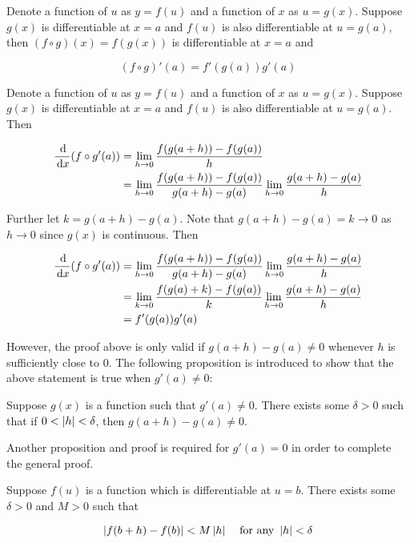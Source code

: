 \documentclass[a4paper,12pt]{article}
\begin{document}
\begin{thm}
  Denote a function of $u$ as $y=f(u)$ and a function of $x$ as $u=g(x)$. Suppose $g(x)$ is differentiable at $x=a$ and $f(u)$ is also differentiable at $u=g(a)$, then $(f\circ g)(x)=f(g(x))$ is differentiable at $x=a$ and

  $$(f\circ g)'(a)=f'(g(a))g'(a)$$\s

  \prf Denote a function of $u$ as $y=f(u)$ and a function of $x$ as $u=g(x)$. Suppose $g(x)$ is differentiable at $x=a$ and $f(u)$ is also differentiable at $u=g(a)$. Then

  $$\begin{aligned}[t]
    \frac{\,\mathrm{d}}{\,\mathrm{d} x}(f\circ g'(a))&=\lim_{h\to 0}\frac{f(g(a+h))-f(g(a))}{h}\\
    &=\lim_{h\to 0}\frac{f(g(a+h))-f(g(a))}{g(a+h)-g(a)}\lim_{h\to 0}\frac{g(a+h)-g(a)}{h}
  \end{aligned}$$\s

  Further let $k=g(a+h)-g(a)$. Note that $g(a+h)-g(a)=k\to 0$ as $h\to 0$ since $g(x)$ is continuous. Then

  $$\begin{aligned}[t]
    \frac{\,\mathrm{d}}{\,\mathrm{d} x}(f\circ g'(a))&=\lim_{h\to 0}\frac{f(g(a+h))-f(g(a))}{g(a+h)-g(a)}\lim_{h\to 0}\frac{g(a+h)-g(a)}{h}\\
    &=\lim_{k\to 0}\frac{f(g(a)+k)-f(g(a))}{k}\lim_{h\to 0}\frac{g(a+h)-g(a)}{h}\\
    &=f'(g(a))g'(a)
  \end{aligned}$$
\end{thm}

However, the proof above is only valid if $g(a+h)-g(a)\neq 0$ whenever $h$ is sufficiently close to $0$. The following proposition is introduced to show that the above statement is true when $g'(a)\neq 0$:\n

\begin{pst}
  Suppose $g(x)$ is a function such that $g'(a)\neq 0$. There exists some $\delta>0$ such that if $0<\left| h\right|<\delta$, then $g(a+h)-g(a)\neq 0$.
\end{pst}\n

Another proposition and proof is required for $g'(a)=0$ in order to complete the general proof.\n

\begin{pst}
  Suppose $f(u)$ is a function which is differentiable at $u=b$. There exists some $\delta>0$ and $M>0$ such that

  $$\left| f(b+h)-f(b)\right|<M\left| h\right|\;\;\;\;\text{for any }\left| h\right|<\delta$$
\end{pst}\n
\end{document}
